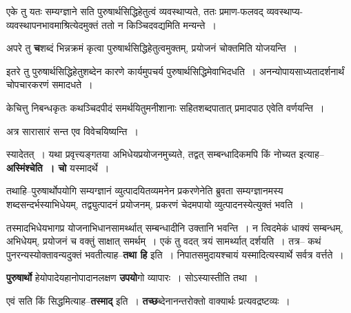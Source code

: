 \documentclass[article,12pt,a4paper]{memoir}
\begin{document}
	  \pstart एके तु यतः सम्यग्ज्ञाने सति पुरुषार्थसिद्धिहेतुत्वं व्यवस्थाप्यते, ततः प्रमाण-फलवद् व्यवस्थाप्य-व्यवस्थापनभावमाश्रित्येदमुक्तं ततो न किञ्चिदवद्यमिति मन्यन्ते ।
	\pend
      

	  \pstart अपरे तु \textbf{च}शब्दं भिन्नक्रमं कृत्वा पुरुषार्थसिद्धिहेतुत्वमुक्तम्, प्रयोजनं चोक्तमिति योजयन्ति ।
	\pend
      

	  \pstart इतरे तु पुरुषार्थसिद्धिहेतुशब्देन कारणे कार्यमुपचर्य पुरुषार्थसिद्धिमेवाभिदधति । अनन्योपायसाध्यतादर्शनार्थं चोपचारकरणं समादधते ।
	\pend
      

	  \pstart केचित्तु निबन्धकृतः कथञ्चिदपीदं समर्थयितुमनीशानाः सहितशब्दपातात् प्रमादपाठ एवेति वर्णयन्ति ।
	\pend
      

	  \pstart अत्र सारासारं सन्त एव विवेचयिष्यन्ति ।
	\pend
      

	  \pstart स्यादेतत् । यथा प्रवृत्त्यङ्गतया अभिधेयप्रयोजनमुच्यते, तद्वत् सम्बन्धादिकमपि किं नोच्यत इत्याह--\textbf{अस्मिंश्चेति । चो} यस्मादर्थे ।  \leavevmode{} 
	  
	तथाहि--पुरुषार्थोपयोगि सम्यग्ज्ञानं व्युत्पादयितव्यमनेन प्रकरणेनेति ब्रुवता सम्यग्ज्ञानमस्य शब्दसन्दर्भस्याभिधेयम्, तद्व्युत्पादनं प्रयोजनम्, प्रकरणं चेदमपायो व्युत्पादनस्येत्युक्तं भवति ।  
	  
	तस्मादभिधेयभागप्र योजनाभिधानसामर्थ्थात् सम्बन्धादीनि उक्तानि भवन्ति । न त्विदमेकं धाक्यं सम्बन्धम्, अभिधेयम्, प्रयोजनं च वक्तुं साक्षात् समर्थम् । एकं तु वदत् त्रयं सामर्थ्यात् दर्शयति । तत्र-- कथं पुनरन्यस्योक्तावन्यदुक्तं भवतीत्याह--\textbf{तथा हि} इति । निपातसमुदायश्चायं यस्मादित्यस्यार्थे सर्वत्र वर्त्तते ।
	\pend
      

	  \pstart \textbf{पुरुषार्थो} हेयोपादेयहानोपादानलक्षण \textbf{उपयो}गो व्यापारः । सोऽस्यास्तीति तथा ।
	\pend
      

	  \pstart एवं सति किं सिद्धमित्याह--\textbf{तस्माद्} इति । \textbf{तच्छ}ब्देनानन्तरोक्तो वाक्यार्थः प्रत्यवद्रष्टव्यः ।
	\pend
      
\end{document}
